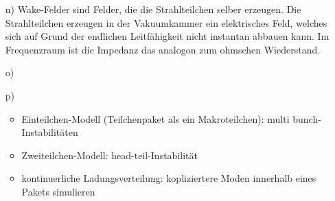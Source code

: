 \documentclass[11pt,a4paper]{article}
\begin{document}
\begin{itemize}
		\item[n)]
			Wake-Felder sind Felder, die die Strahlteilchen selber erzeugen.
			Die Strahlteilchen erzeugen in der Vakuumkammer ein elektrisches Feld,
			welches sich auf Grund der endlichen Leitfähigkeit nicht instantan abbauen kann.
			Im Frequenzraum ist die Impedanz das analogon zum ohmschen Wiederstand.
		
		\item[o)]   
		
		
		\item[p)]      
			\begin{itemize}
				\item Einteilchen-Modell (Teilchenpaket als ein Makroteilchen): multi bunch- Instabilitäten
				\item Zweiteilchen-Modell: head-teil-Instabilität
				\item kontinuerliche Ladungsverteilung: kopliziertere Moden innerhalb eines Pakets simulieren
			\end{itemize}


	\end{itemize}
\end{document}
